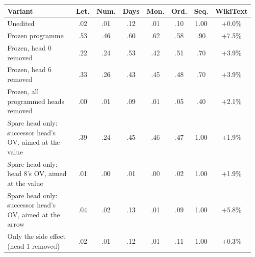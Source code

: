 \begin{tabular}{lccccccc}
\toprule
Variant & Let. & Num. & Days & Mon. & Ord. & Seq. & WikiText \\
\midrule
Unedited & .02 & .01 & .12 & .01 & .10 & 1.00 & +0.0\% \\
Frozen programme & .53 & .46 & .60 & .62 & .58 & .90 & +7.5\% \\
\midrule
Frozen, head 0 removed & .22 & .24 & .53 & .42 & .51 & .70 & +3.9\% \\
Frozen, head 6 removed & .33 & .26 & .43 & .45 & .48 & .70 & +3.9\% \\
Frozen, all programmed heads removed & .00 & .01 & .09 & .01 & .05 & .40 & +2.1\% \\
\midrule
Spare head only: successor head's OV, aimed at the value & .39 & .24 & .45 & .46 & .47 & 1.00 & +1.9\% \\
Spare head only: head 8's OV, aimed at the value & .01 & .00 & .01 & .00 & .02 & 1.00 & +1.9\% \\
Spare head only: successor head's OV, aimed at the arrow & .04 & .02 & .13 & .01 & .09 & 1.00 & +5.8\% \\
Only the side effect (head 1 removed) & .02 & .01 & .12 & .01 & .11 & 1.00 & +0.3\% \\
\bottomrule
\end{tabular}
